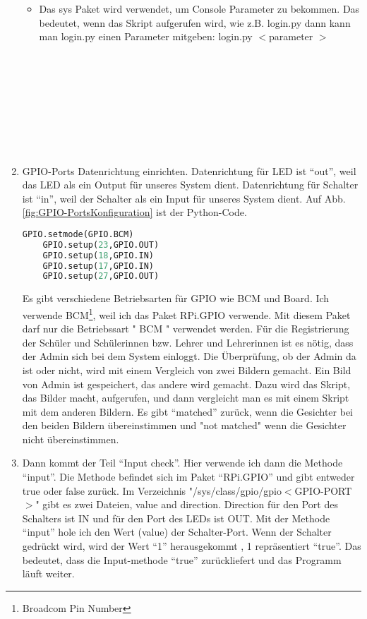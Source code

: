 \begin{enumerate}
\begin{itemize}
	 \item Das sys Paket wird verwendet, um Console Parameter zu bekommen. Das bedeutet, wenn das Skript aufgerufen wird, wie z.B. login.py dann kann man login.py einen Parameter mitgeben:  login.py $<$parameter $>$ \\ \\ \\ \\ \\ \\ \\ \\ \\ 
   \end{itemize}
	\item GPIO-Ports Datenrichtung einrichten. Datenrichtung f\"ur LED ist ``out'', weil das LED als ein Output f\"ur unseres System dient. Datenrichtung f\"ur Schalter ist ``in'', weil der Schalter als ein Input f\"ur unseres System dient. Auf Abb. \ref{fig:GPIO-PortsKonfiguration} ist der Python-Code.
	\begin{lstlisting}[caption={GPIO-Ports Konfiguration},label={fig:GPIO-PortsKonfiguration},language=Python]
	GPIO.setmode(GPIO.BCM)
	GPIO.setup(23,GPIO.OUT)
	GPIO.setup(18,GPIO.IN)
	GPIO.setup(17,GPIO.IN)
	GPIO.setup(27,GPIO.OUT)
	\end{lstlisting}
	Es gibt verschiedene Betriebsarten f\"ur GPIO wie BCM und Board.
	Ich verwende BCM\footnote{Broadcom Pin Number}, weil ich das Paket RPi.GPIO verwende. Mit diesem Paket darf nur die Betriebssart " BCM " verwendet werden. 
	\cite{gpiomode}
	F\"ur die Registrierung der Sch\"uler und Sch\"ulerinnen bzw. Lehrer und Lehrerinnen ist es n\"otig, dass der Admin sich bei dem System einloggt. Die \"Uberpr\"ufung, ob der Admin da ist oder nicht,  wird mit einem Vergleich von zwei Bildern gemacht. Ein Bild von Admin ist gespeichert, das andere wird gemacht. Dazu wird das Skript, das Bilder macht, aufgerufen, und dann vergleicht man es mit einem Skript mit dem anderen Bildern. Es gibt ``matched'' zur\"uck, wenn die Gesichter bei den beiden Bildern \"ubereinstimmen und "not matched" wenn die Gesichter nicht \"ubereinstimmen.
	\item Dann kommt der Teil ``Input check''. 
	Hier verwende ich dann die Methode ``input''. Die Methode befindet sich im Paket ``RPi.GPIO'' und gibt entweder true oder false zur\"uck. 
	Im Verzeichnis "/sys/class/gpio/gpio$<$GPIO-PORT$>$" gibt es zwei Dateien, value and direction. Direction f\"ur den Port des Schalters ist IN und f\"ur den Port des LEDs ist OUT. Mit der Methode ``input'' hole ich den Wert (value) der Schalter-Port. Wenn der Schalter gedr\"uckt wird, wird der Wert ``1'' herausgekommt , 1 repr\"asentiert ``true''. Das bedeutet, dass die Input-methode ``true'' zur\"uckliefert und das Programm l\"auft weiter.
	

\end{enumerate}
